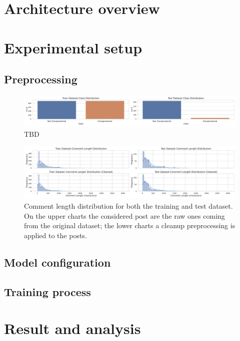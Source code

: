 \documentclass[11pt]{article}
\begin{document}
\section{Architecture overview}\label{sec:architecture-overview}

\section{Experimental setup}\label{sec:experimental-setup}

\subsection{Preprocessing}\label{sec:preprocessing}
\begin{figure}
  \centering
  \includegraphics[width=\textwidth]{figures/class_distribution.pdf}
  \caption{TBD}
  \label{fig:class-frequency}
\end{figure}

\begin{figure}
  \centering
  \includegraphics[width=\textwidth]{figures/comment_length_distribution.pdf}
  \caption{
    Comment length distribution for both the training and test dataset.
    On the upper charts the considered post are the raw ones coming from the original dataset;
    the lower charts a cleanup preprocessing is applied to the posts.
  }
  \label{fig:words-distribution}
\end{figure}

\subsection{Model configuration}\label{sec:model-config}

\subsection{Training process}\label{sec:training-process}

\section{Result and analysis}\label{sec:results-analysis}

\nocite{*}





\end{document}
